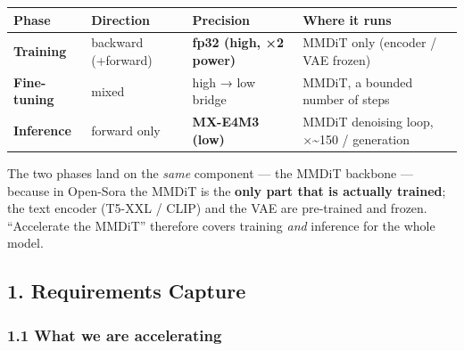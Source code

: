 \documentclass[
  10pt,
]{article}
\newcounter{none} %
\begin{document}
{\def\LTcaptype{none} %
\begin{longtable}[]{@{}
  >{\raggedright\arraybackslash}p{}
  >{\raggedright\arraybackslash}p{}
  >{\raggedright\arraybackslash}p{}
  >{\raggedright\arraybackslash}p{}@{}}
\toprule\noalign{}
\begin{minipage}[b]{\linewidth}\raggedright
Phase
\end{minipage} & \begin{minipage}[b]{\linewidth}\raggedright
Direction
\end{minipage} & \begin{minipage}[b]{\linewidth}\raggedright
Precision
\end{minipage} & \begin{minipage}[b]{\linewidth}\raggedright
Where it runs
\end{minipage} \\
\midrule\noalign{}
\endhead
\bottomrule\noalign{}
\endlastfoot
\textbf{Training} & backward (+forward) & \textbf{fp32 (high, ×2 power)} & MMDiT
only (encoder / VAE frozen) \\
\textbf{Fine-tuning} & mixed & high → low bridge & MMDiT, a bounded
number of steps \\
\textbf{Inference} & forward only & \textbf{MX-E4M3 (low)} & MMDiT
denoising loop, ×\textasciitilde150 / generation \\
\end{longtable}
}

The two phases land on the \emph{same} component --- the MMDiT backbone
--- because in Open-Sora the MMDiT is the \textbf{only part that is
actually trained}; the text encoder (T5-XXL / CLIP) and the VAE are
pre-trained and frozen. ``Accelerate the MMDiT'' therefore covers
training \emph{and} inference for the whole model.

\subsection{1. Requirements Capture}\label{requirements-capture}

\subsubsection{1.1 What we are
accelerating}\label{what-we-are-accelerating}
\end{document}
